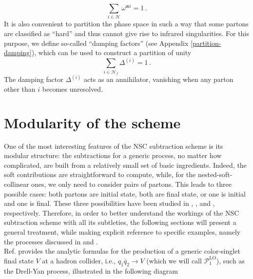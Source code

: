 \documentclass[a4paper, 12pt]{book}
\newcommand{\um}{\mathfrak{m}}
\begin{document}
\begin{equation}
    \sum_{i \in \mathcal{H}} \omega^{\um i} = 1 \,.
\end{equation}
It is also convenient to partition the phase space in such a way that some partons are classified as ``hard” and thus cannot give rise to infrared singularities. For this purpose, we define so-called ``damping factors” (see Appendix \ref{partition-damping}), which can be used to construct a partition of unity
\begin{equation}
  \sum_{i \in \mathcal{H}_f} \Delta^{(i)}=1 \, .
\end{equation}
The damping factor $\Delta^{(i)}$ acts as an annihilator, vanishing when any parton other than $i$ becomes unresolved.


\section{Modularity of the scheme}
One of the most interesting features of the NSC subtraction scheme is its modular structure: the subtractions for a generic process, no matter how complicated, are built from a relatively small set of basic ingredients. Indeed, the soft contributions are straightforward to compute, while, for the nested-soft-collinear ones, we only need to consider pairs of partons. This leads to three possible cases: both partons are initial state, both are final state, or one is initial and one is final. These three possibilities have been studied in \cite{Caola:1902}, \cite{Caola:1907}, and \cite{Asteriadis:1910}, respectively. Therefore, in order to better understand the workings of the NSC subtraction scheme with all its subtleties, the following sections will present a general treatment, while making explicit reference to specific examples, namely the processes discussed in \cite{Caola:1902} and \cite{Caola:1907}.
\\
Ref. \cite{Caola:1902} provides the analytic formulas for the production of a generic color-singlet final state $V$ at a hadron collider, i.e., $q_1\bar{q}_2 \to V$ (which we will call $\mathcal{P}_{1}^{\mathrm{LO}}$), such as the Drell-Yan process, illustrated in the following diagram
\end{document}
